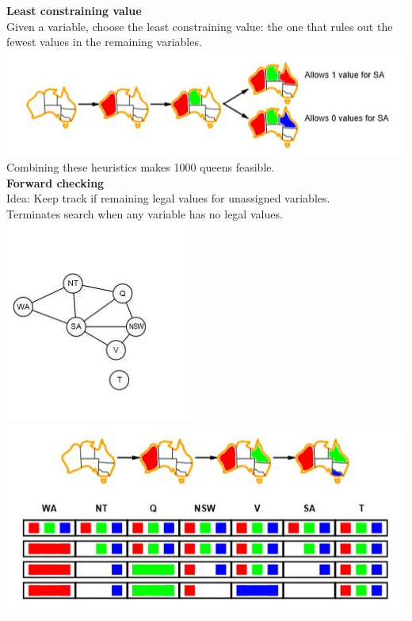 \textbf{Least constraining value}\\
Given a variable, choose the least constraining value: the one that rules out the fewest values in the remaining variables.\\

\includegraphics[scale=1]{chap1_pics/backtrack3.jpeg}
Combining these heuristics makes 1000 queens feasible.\\


\textbf{Forward checking}\\
Idea: Keep track if remaining legal values for unassigned variables.\\
Terminates search when any variable has no legal values.\\

\includegraphics[scale=1]{chap1_pics/australiamap.jpeg}\\
\includegraphics[scale=1]{chap1_pics/backtrack4.jpeg}


